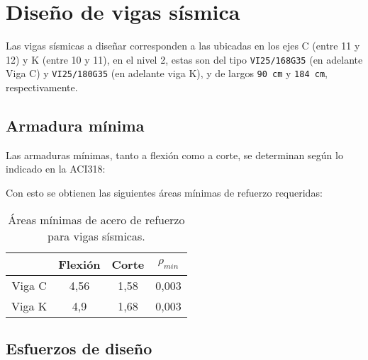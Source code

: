 \newpage

\section{Diseño de vigas sísmica}

    Las vigas sísmicas a diseñar corresponden a las ubicadas en los ejes C (entre 11 y 12) y K (entre 10 y 11), en el nivel 2, estas son del tipo \texttt{VI25/168G35} (en adelante Viga C) y \texttt{VI25/180G35} (en adelante viga K), y de largos \texttt{90 cm} y \texttt{184 cm}, respectivamente.
    
    
    \subsection{Armadura mínima}
    
        Las armaduras mínimas, tanto a flexión como a corte, se determinan según lo indicado en la ACI318:
        
        
        
        Con esto se obtienen las siguientes áreas mínimas de refuerzo requeridas:
        
        \begin{table}[H]
          \centering
          \caption{Áreas mínimas de acero de refuerzo para vigas sísmicas.}
            \begin{tabular}{cccc}
            \cline{2-4} & Flexión & Corte & $\rho_{min}$ \bigstrut\\
            \hline
            Viga C & 4,56  & 1,58  & 0,003 \bigstrut[t]\\
            Viga K & 4,9   & 1,68  & 0,003 \bigstrut[b]\\
            \hline
            \end{tabular}%
          \label{area-min-sismica}%
        \end{table}%
        
    \subsection{Esfuerzos de diseño}

